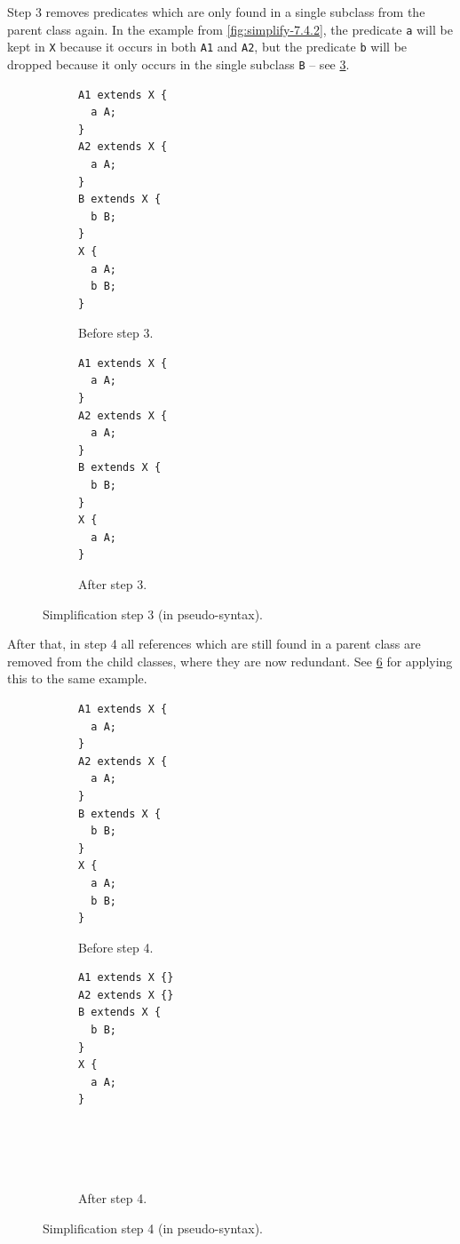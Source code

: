 Step 3  removes predicates which are only found in a single subclass
from the parent class again.
In the example from \cref{fig:simplify-7.4.2},
the predicate \lstinline{a} will be kept in \lstinline{X}
because it occurs in both \lstinline{A1} and \lstinline{A2},
but the predicate \lstinline{b} will be dropped
because it only occurs in the single subclass \lstinline{B} –
see \cref{fig:simplify-7.4.3}.

\begin{figure}[ht]
  \begin{subfigure}[t]{0.45\textwidth}
    \begin{lstlisting}
A1 extends X {
  a A;
}
A2 extends X {
  a A;
}
B extends X {
  b B;
}
X {
  a A;
  b B;
}
    \end{lstlisting}
    \caption{Before step 3.}
    \label{fig:simplify-7.4.3-before}
  \end{subfigure}
  \begin{subfigure}[t]{0.45\textwidth}
    \begin{lstlisting}[showlines=true]
A1 extends X {
  a A;
}
A2 extends X {
  a A;
}
B extends X {
  b B;
}
X {
  a A;
}

    \end{lstlisting}
    \caption{After step 3.}
    \label{fig:simplify-7.4.3-after}
  \end{subfigure}
  \caption[Simplification step 3.]{Simplification step 3 (in pseudo-syntax).}
  \label{fig:simplify-7.4.3}
\end{figure}

After that, in step 4 all references which are still found in a parent class
are removed from the child classes, where they are now redundant.
See \cref{fig:simplify-7.4.4} for applying this to the same example.

\begin{figure}[ht]
  \begin{subfigure}[t]{0.45\textwidth}
    \begin{lstlisting}
A1 extends X {
  a A;
}
A2 extends X {
  a A;
}
B extends X {
  b B;
}
X {
  a A;
  b B;
}
    \end{lstlisting}
    \caption{Before step 4.}
    \label{fig:simplify-7.4.4-before}
  \end{subfigure}
  \begin{subfigure}[t]{0.45\textwidth}
    \begin{lstlisting}[showlines=true]
A1 extends X {}
A2 extends X {}
B extends X {
  b B;
}
X {
  a A;
}





    \end{lstlisting}
    \caption{After step 4.}
    \label{fig:simplify-7.4.4-after}
  \end{subfigure}
  \caption[Simplification step 4.]{Simplification step 4 (in pseudo-syntax).}
  \label{fig:simplify-7.4.4}
\end{figure}

